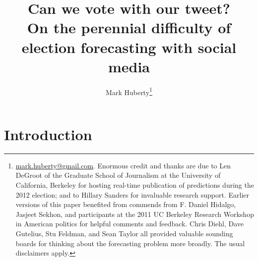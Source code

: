 \documentclass{article}
\begin{document}
\title{Can we vote with our tweet?\\ On the perennial difficulty of election
forecasting with social media}
\author{
  Mark Huberty\thanks{\url{mark.huberty@gmail.com}. Enormous credit and thanks are due to Len DeGroot of the
  Graduate School of Journalism at the University of California,
  Berkeley for hosting real-time publication of predictions during the
2012 election; and to Hillary Sanders for invaluable research
support. Earlier versions of this paper benefited from commends from F. Daniel Hidalgo, Jasjeet Sekhon, and
participants at the 2011 UC Berkeley Research Workshop in American
politics for helpful comments and feedback. Chris Diehl, Dave
Gutelius, Stu Feldman, and Sean Taylor all provided valuable sounding boards for
thinking about the forecasting problem more broadly. The usual disclaimers apply.}
}

\maketitle

\doublespacing
\section{Introduction}
\label{sec:introduction}

\end{document}
